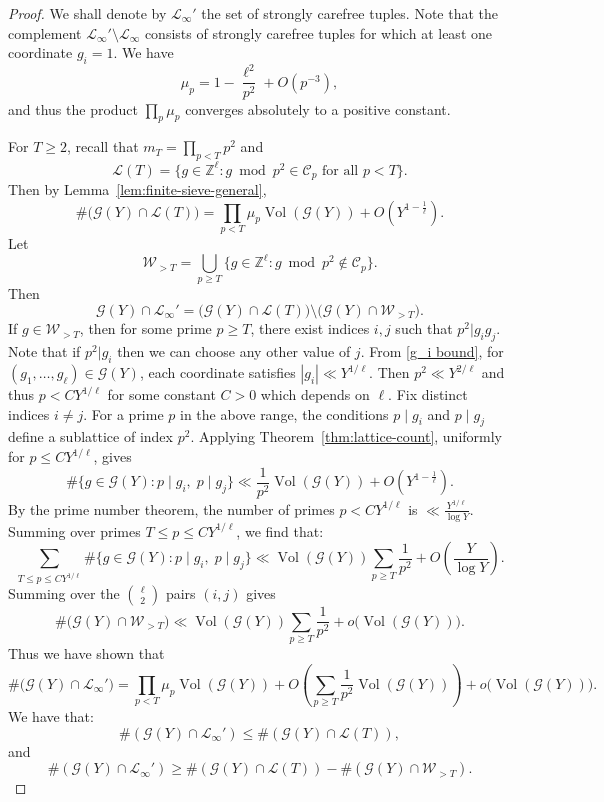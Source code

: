 \documentclass{amsart}
\theoremstyle{plain}
\theoremstyle{definition}
\theoremstyle{remark}
\numberwithin{equation}{section}
\begin{document}
\begin{proof}
We shall denote by $\mathcal L_\infty'$ the set of strongly carefree tuples. Note that the complement $\mathcal L_\infty'\setminus \mathcal L_\infty$ consists of strongly carefree tuples for which at least one coordinate $g_i=1$. We have
\[
\mu_p
=
1-\frac{\ell^2}{p^2}
+O(p^{-3}),
\]and thus the product $\prod_p\mu_p$ converges absolutely to a positive constant.
\par For $T\ge2$, recall that $m_T=\prod_{p<T}p^2$ and 
\[\mathcal L(T)
=
\{g\in\mathbb Z^\ell :
g\bmod p^2\in\mathcal C_p
\text{ for all } p<T\}.
\]
Then by Lemma~\ref{lem:finite-sieve-general},
\[
\#\bigl(\mathcal G(Y)\cap\mathcal L(T)\bigr)
=
\prod_{p<T} \mu_p\operatorname{Vol}(\mathcal G(Y))
+
O\!\left(Y^{1-\frac1\ell}\right).
\]Let
\[
\mathcal W_{>T}
=
\bigcup_{p\ge T}
\{g\in\mathbb Z^\ell :
g\bmod p^2\notin\mathcal C_p\}.
\]
Then
\[
\mathcal G(Y)\cap\mathcal L_\infty'
=
\bigl(\mathcal G(Y)\cap\mathcal L(T)\bigr)
\setminus
\bigl(\mathcal G(Y)\cap\mathcal W_{>T}\bigr).
\]
\noindent If $g\in\mathcal W_{>T}$,
then for some prime $p\ge T$, there exist indices $i,j$ such that $p^2 |g_i g_j$. Note that if $p^2|g_i$ then we can choose any other value of $j$. From \eqref{g_i bound}, for $(g_1, \dots, g_\ell)\in \mathcal G(Y)$, each coordinate satisfies $|g_i|\ll Y^{1/\ell}$. Then $p^2\ll Y^{2/\ell}$ and thus $p<CY^{1/\ell}$ for some constant $C>0$ which depends on $\ell$. 
Fix distinct indices $i\neq j$.
For a prime $p$ in the above range,
the conditions $p\mid g_i$ and $p\mid g_j$
define a sublattice of index $p^2$.
Applying Theorem~\ref{thm:lattice-count},
uniformly for $p\le CY^{1/\ell}$,
gives
\[
\#\{g\in\mathcal G(Y): p\mid g_i,\; p\mid g_j\}
\ll
\frac{1}{p^2}
\operatorname{Vol}(\mathcal G(Y))
+
O\!\left(Y^{1-\frac1\ell}\right).
\]
\noindent By the prime number theorem, the number of primes $p<C Y^{1/\ell}$ is $\ll \frac{Y^{1/\ell}}{\log Y}$. Summing over primes $T\le p\le CY^{1/\ell}$, we find that:
\[
\sum_{T\le p\le CY^{1/\ell}}
\#\{g\in\mathcal G(Y): p\mid g_i,\; p\mid g_j\}
\ll
\operatorname{Vol}(\mathcal G(Y))
\sum_{p\ge T}\frac1{p^2}
+
O\!\left(
\frac{Y}{\log Y}
\right).
\]
Summing over the $\binom{\ell}{2}$ pairs $(i,j)$ gives
\[
\#\bigl(\mathcal G(Y)\cap\mathcal W_{>T}\bigr)
\ll
\operatorname{Vol}(\mathcal G(Y))\sum_{p\ge T}\frac1{p^2}
+
o\!\bigl(\operatorname{Vol}(\mathcal G(Y))\bigr).
\]
Thus we have shown that 
\begin{equation}\label{liminf eqn}
\#\bigl(\mathcal G(Y)\cap\mathcal L_\infty'\bigr)
=
\prod_{p<T} \mu_p\operatorname{Vol}(\mathcal G(Y))
+
O\!\left(\sum_{p\geq T} \frac{1}{p^2}\operatorname{Vol}(\mathcal G(Y)) 
\right)
+
o\!\bigl(\operatorname{Vol}(\mathcal G(Y))\bigr).
\end{equation}
We have that:
\[
\#(\mathcal G(Y)\cap\mathcal L_\infty')
\le
\#(\mathcal G(Y)\cap\mathcal L(T)),
\]
and
\[
\#(\mathcal G(Y)\cap\mathcal L_\infty')
\ge
\#(\mathcal G(Y)\cap\mathcal L(T))
-
\#(\mathcal G(Y)\cap\mathcal W_{>T}).
\]


\end{proof}
\end{document}
